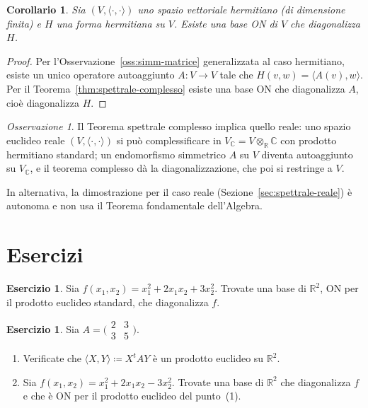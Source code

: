 \documentclass[11pt, a4paper]{book}
\theoremstyle{definition}
\newtheorem{esercizio}[definizione]{Esercizio}
\theoremstyle{plain}
\newtheorem{corollario}[definizione]{Corollario}
\theoremstyle{remark}
\newtheorem{osservazione}[definizione]{Osservazione}
\newcommand{\R}{\mathbb{R}}
\newcommand{\C}{\mathbb{C}}
\begin{document}
\begin{corollario}
\label{cor:spettrale-forme-herm}
Sia $(V,\langle\cdot,\cdot\rangle)$ uno spazio vettoriale hermitiano (di dimensione finita) e $H$ una forma hermitiana su $V$. Esiste una base ON di $V$ che diagonalizza $H$.
\end{corollario}

\begin{proof}
Per l'Osservazione~\ref{oss:simm-matrice} generalizzata al caso hermitiano, esiste un unico operatore autoaggiunto $A \colon V \to V$ tale che $H(v,w) = \langle A(v),w\rangle$. Per il Teorema~\ref{thm:spettrale-complesso} esiste una base ON che diagonalizza $A$, cioè diagonalizza $H$.
\end{proof}

\begin{osservazione}
Il Teorema spettrale complesso implica quello reale: uno spazio euclideo reale $(V,\langle\cdot,\cdot\rangle)$ si può complessificare in $V_\C = V \otimes_\R \C$ con prodotto hermitiano standard; un endomorfismo simmetrico $A$ su $V$ diventa autoaggiunto su $V_\C$, e il teorema complesso dà la diagonalizzazione, che poi si restringe a $V$.

In alternativa, la dimostrazione per il caso reale (Sezione~\ref{sec:spettrale-reale}) è autonoma e non usa il Teorema fondamentale dell'Algebra.
\end{osservazione}

\section*{Esercizi}
\label{sec:es-cap9}

\begin{esercizio}
Sia $f(x_1,x_2) = x_1^2+2x_1x_2+3x_2^2$. Trovate una base di $\R^2$, ON per il prodotto euclideo standard, che diagonalizza $f$.
\end{esercizio}

\begin{esercizio}
Sia $A = \bigl(\begin{smallmatrix}2&3\\3&5\end{smallmatrix}\bigr)$.
\begin{enumerate}[label=(\arabic*)]
  \item Verificate che $\langle X,Y\rangle \coloneqq X^t A Y$ è un prodotto euclideo su $\R^2$.
  \item Sia $f(x_1,x_2) = x_1^2+2x_1x_2-3x_2^2$. Trovate una base di $\R^2$ che diagonalizza $f$ e che è ON per il prodotto euclideo del punto~(1).
\end{enumerate}
\end{esercizio}
\end{document}

